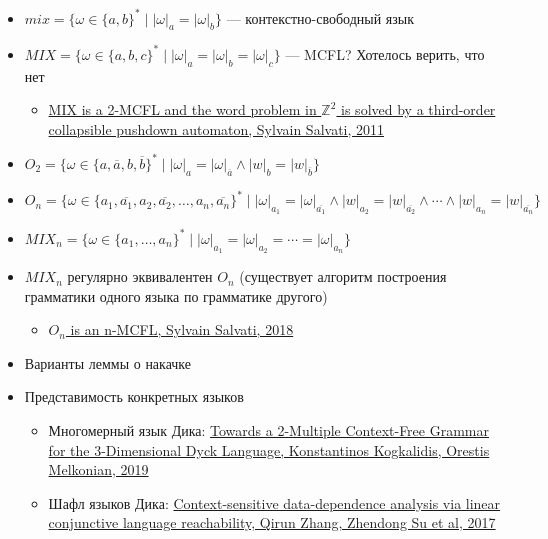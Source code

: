 \begin{itemize}
    \item $mix = \{\omega \in \{a,b\}^* \mid |\omega|_a = |\omega|_b \}$ --- контекстно-свободный язык

    \item $MIX = \{\omega \in \{a,b,c\}^* \mid |\omega|_a = |\omega|_b = |\omega|_c\}$ --- MCFL? Хотелось верить, что нет
    \begin{itemize}
      \item \href{https://hal.inria.fr/inria-00564552/document}{MIX is a 2-MCFL and the word problem in $\mathbb{Z}^2$ is solved by a third-order collapsible pushdown automaton, Sylvain Salvati, 2011}~\cite{salvati:inria-00564552}
    \end{itemize}    
    \item $O_2=\{\omega \in \{a,\overline{a},b,\overline{b}\}^* \mid |\omega|_a=|\omega|_{\overline{a}} \wedge |w|_b=|w|_{\overline{b}}\}$
    \item $O_n=\{\omega \in \{a_1,\overline{a_1},a_2,\overline{a_2},\ldots,a_n,\overline{a_n}\}^* \mid |\omega|_{a_1}=|\omega|_{\overline{a_1}} \wedge |w|_{a_2}=|w|_{\overline{a_2}} \wedge \cdots \wedge |w|_{a_n}=|w|_{\overline{a_n}}\}$
    \item $MIX_n = \{\omega \in \{a_1,\ldots,a_n\}^* \mid |\omega|_{a_1} = |\omega|_{a_2} =\cdots = |\omega|_{a_n}\}$    
    \item $MIX_n$ регулярно эквивалентен $O_n$ (существует алгоритм построения грамматики одного языка по грамматике другого)
    \begin{itemize}
      \item \href{https://hal.archives-ouvertes.fr/hal-01771670/document}{$O_n$ is an n-MCFL, Sylvain Salvati, 2018}~\cite{GEBHARDT202241}
    \end{itemize}
  \end{itemize}
  

  \begin{itemize}
    \item Варианты леммы о накачке
    \item Представимость конкретных языков
    \begin{itemize}
      \item Многомерный язык Дика: \href{https://link.springer.com/chapter/10.1007/978-3-662-59620-3_5}{Towards a 2-Multiple Context-Free Grammar for the 3-Dimensional Dyck Language, Konstantinos Kogkalidis, Orestis Melkonian, 2019}~\cite{10.1007/978-3-662-59620-3_5}
      \item Шафл языков Дика: \href{https://dl.acm.org/doi/10.1145/3093333.3009848}{Context-sensitive data-dependence analysis via linear conjunctive language reachability, Qirun Zhang, Zhendong Su et al, 2017}~\cite{10.1145/3009837.3009848}
    \end{itemize}
  \end{itemize}  

